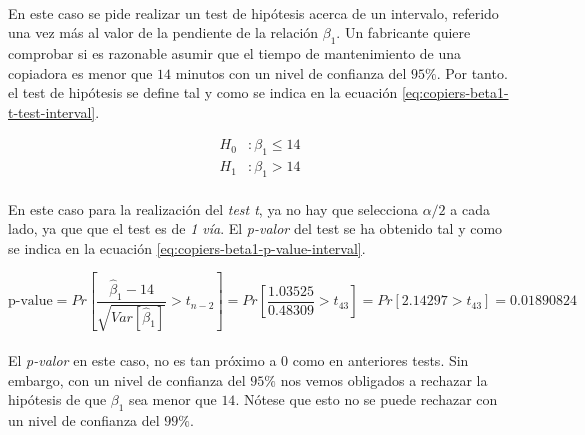 \documentclass{article}
\begin{document}
        \paragraph{}
        En este caso se pide realizar un test de hipótesis acerca de un intervalo, referido una vez más al valor de la pendiente de la relación $\beta_1$. Un fabricante quiere comprobar si es razonable asumir que el tiempo de mantenimiento de una copiadora es menor que $14$ minutos con un nivel de confianza del $95\%$. Por tanto. el test de hipótesis se define tal y como se indica en la ecuación \eqref{eq:copiers-beta1-t-test-interval}.

        \begin{equation}
        \label{eq:copiers-beta1-t-test-interval}
          \begin{split}
            H_0&: \beta_1 \leq 14 \\
            H_1&: \beta_1 > 14
          \end{split}
        \end{equation}

        \paragraph{}
        En este caso para la realización del \emph{test t}, ya no hay que selecciona $\alpha/2$ a cada lado, ya que que el test es de \emph{1 vía}. El \emph{p-valor} del test se ha obtenido tal y como se indica en la ecuación \eqref{eq:copiers-beta1-p-value-interval}.

        \begin{equation}
          \label{eq:copiers-beta1-p-value-interval}
            \text{p-value}
            = Pr\left[\frac{\widehat{\beta}_1 - 14}{\sqrt{Var\left[\widehat{\beta}_1\right]}} > t_{n-2}\right]
            = Pr\left[\frac{1.03525}{0.48309} > t_{43}\right]
            = Pr\left[2.14297 > t_{43}\right]
            = 0.01890824
        \end{equation}

        \paragraph{}
        El \emph{p-valor} en este caso, no es tan próximo a $0$ como en anteriores tests. Sin embargo, con un nivel de confianza del $95\%$ nos vemos obligados a rechazar la hipótesis de que $\beta_1$ sea menor que $14$. Nótese que esto no se puede rechazar con un nivel de confianza del $99\%$.
\end{document}
